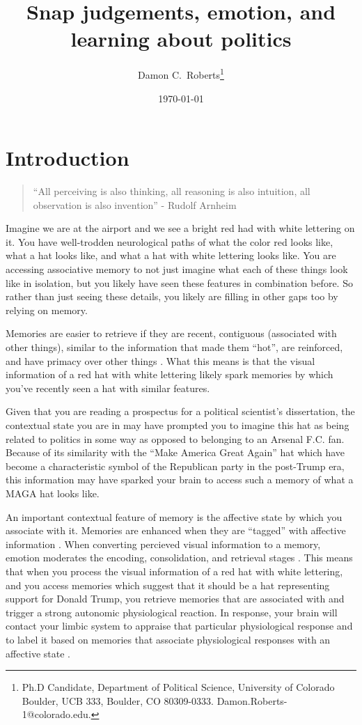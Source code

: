 \documentclass [12pt]{article}
\title{Snap judgements, emotion, and learning about politics}
\author{Damon C.\ Roberts\footnote{Ph.D Candidate,
Department of Political Science, University of Colorado Boulder, UCB 333, Boulder, CO 80309-0333. Damon.Roberts-1@colorado.edu.}}
\date{\today}
\begin{document}
\maketitle


\newpage
\doublespace
\newpage
\section*{Introduction}

\begin{quote}
    ``All perceiving is also thinking, all reasoning is also intuition, all observation is also invention'' - Rudolf Arnheim
\end{quote}

Imagine we are at the airport and we see a bright red had with white lettering on it. You have well-trodden neurological paths of what the color red looks like, what a hat looks like, and what a hat with white lettering looks like. You are accessing associative memory to not just imagine what each of these things look like in isolation, but you likely have seen these features in combination before. So rather than just seeing these details, you likely are filling in other gaps too by relying on memory.

Memories are easier to retrieve if they are recent, contiguous (associated with other things), similar to the information that made them ``hot'', are reinforced, and have primacy over other things \citep{kahana_et-al_2022_ohhm}. What this means is that the visual information of a red hat with white lettering likely spark memories by which you've recently seen a hat with similar features.

Given that you are reading a prospectus for a political scientist's dissertation, the contextual state you are in may have prompted you to imagine this hat as being related to politics in some way as opposed to belonging to an Arsenal F.C. fan. Because of its similarity with the ``Make America Great Again'' hat which have become a characteristic symbol of the Republican party in the post-Trump era, this information may have sparked your brain to access such a memory of what a MAGA hat looks like. 

An important contextual feature of memory is the affective state by which you associate with it. Memories are enhanced when they are ``tagged'' with affective information \citep{kensinger_fields_2022_ohhum}. When converting percieved visual information to a memory, emotion moderates the encoding, consolidation, and retrieval stages \citep{kensinger_fields_2022_ohhum}. This means that when you process the visual information of a red hat with white lettering, and you access memories which suggest that it should be a hat representing support for Donald Trump, you retrieve memories that are associated with and trigger a strong autonomic physiological reaction. In response, your brain will contact your limbic system to appraise that particular physiological response and to label it based on memories that associate physiological responses with an affective state \citep{valentino_et-al_2011_jop}.
\end{document}
